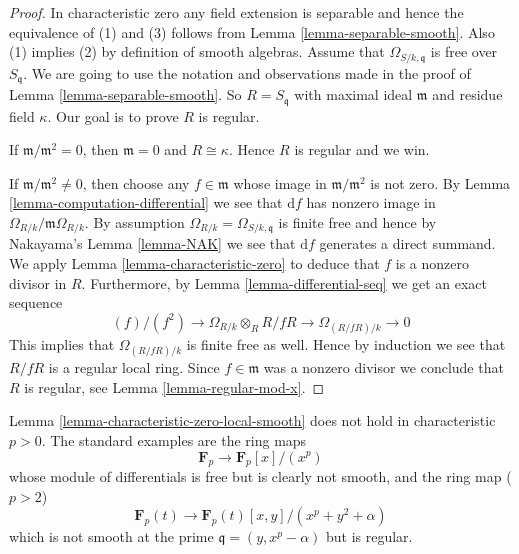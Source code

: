 \begin{proof}
In characteristic zero any field extension is separable and hence the
equivalence of (1) and (3) follows from Lemma \ref{lemma-separable-smooth}.
Also (1) implies (2) by definition of smooth algebras.
Assume that $\Omega_{S/k, \mathfrak q}$ is free over $S_{\mathfrak q}$.
We are going to use the notation and observations made in the
proof of Lemma \ref{lemma-separable-smooth}. So $R = S_{\mathfrak q}$
with maximal ideal $\mathfrak m$ and residue field $\kappa$.
Our goal is to prove $R$ is regular.

\medskip\noindent
If $\mathfrak m/\mathfrak m^2 = 0$, then $\mathfrak m = 0$
and $R \cong \kappa$. Hence $R$ is regular and we win.

\medskip\noindent
If $\mathfrak m/ \mathfrak m^2 \not = 0$, then choose any
$f \in \mathfrak m$ whose image in $\mathfrak m/ \mathfrak m^2$
is not zero. By Lemma \ref{lemma-computation-differential}
we see that $\text{d}f$ has nonzero image in
$\Omega_{R/k}/\mathfrak m\Omega_{R/k}$. By assumption
$\Omega_{R/k} = \Omega_{S/k, \mathfrak q}$ is finite free and
hence by Nakayama's Lemma \ref{lemma-NAK} we see that
$\text{d}f$ generates a direct summand. We apply
Lemma \ref{lemma-characteristic-zero}
to deduce that $f$ is a nonzero divisor in $R$.
Furthermore, by Lemma \ref{lemma-differential-seq} we get an exact sequence
$$
(f)/(f^2) \to \Omega_{R/k} \otimes_R R/fR \to \Omega_{(R/fR)/k} \to 0
$$
This implies that $\Omega_{(R/fR)/k}$ is finite free as well.
Hence by induction we see that $R/fR$ is a regular local ring.
Since $f \in \mathfrak m$ was a nonzero divisor we
conclude that $R$ is regular, see Lemma \ref{lemma-regular-mod-x}.
\end{proof}

\begin{example}
\label{example-characteristic-p}
Lemma \ref{lemma-characteristic-zero-local-smooth}
does not hold in characteristic $p > 0$.
The standard examples are the ring maps
$$
\mathbf{F}_p \longrightarrow \mathbf{F}_p[x]/(x^p)
$$
whose module of differentials is free but is clearly not smooth, and
the ring map ($p > 2$)
$$
\mathbf{F}_p(t) \to \mathbf{F}_p(t)[x, y]/(x^p + y^2 + \alpha)
$$
which is not smooth at the prime $\mathfrak q = (y, x^p - \alpha)$
but is regular.
\end{example}
















